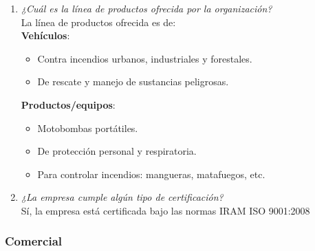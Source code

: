 \documentclass[a4paper,10pt]{article}
\begin{document}
\begin{enumerate}
				\item \textit{¿Cuál es la línea de productos ofrecida por la organización?}\\	
				La línea de productos ofrecida es de:\\
				\textbf{Vehículos}:
				\begin{itemize}
					\item Contra incendios urbanos, industriales y forestales.
					\item De rescate y manejo de sustancias peligrosas.
				\end{itemize}
				\textbf{Productos/equipos}:
				\begin{itemize}
					\item Motobombas portátiles.
					\item De protección personal y respiratoria.
					\item Para controlar incendios: mangueras, matafuegos, etc.
				\end{itemize}	
												
				\item \textit{¿La empresa cumple algún tipo de certificación?}\\
				Sí, la empresa está certificada bajo las normas IRAM ISO 9001:2008
						
			\end{enumerate}
			
			
		\subsubsection{Comercial}
		
\end{document}
